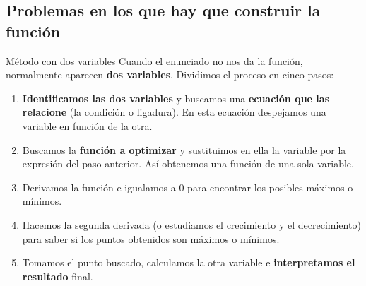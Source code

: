 \documentclass[11pt,a4paper]{article}
\makeatletter
\newcommand{\fmm}[1]{\setbox0=\hbox{$#1$}\ifdim\wd0>0.8\linewidth\def\fmmnext{\fmmdisp{#1}}\else\def\fmmnext{\mbox{\box0}}\fi\fmmnext}
\def\fmmdisp#1{\@ifnextchar.{\fmmdispp{#1}}{\@ifnextchar,{\fmmdispc{#1}}{\@ifnextchar;{\fmmdisps{#1}}{\fmdisp{#1}}}}}
\def\fmmdispp#1.{\fmdisp{#1\,.}}\def\fmmdispc#1,{\fmdisp{#1\,,}}\def\fmmdisps#1;{\fmdisp{#1\,;}}
\newcommand{\fmdisp}[1]{\[\setbox2=\hbox{$\displaystyle #1$}\ifdim\wd2>\linewidth\resizebox{\linewidth}{!}{\box2}\else\box2\fi\]}
\newcommand{\fmuline}[1]{\textbf{\color{fmaccent}#1}}
\makeatother
\begin{document}
\Needspace{5.1cm}
\subsection*{Problemas en los que hay que construir la función}
\begin{fmdef}{Método con dos variables}
Cuando el enunciado no nos da la función, normalmente aparecen \textbf{dos variables}. Dividimos el proceso en cinco pasos:

\begin{enumerate}
\item \textbf{Identificamos las dos variables} y buscamos una \textbf{ecuación que las relacione} (la condición o ligadura). En esta ecuación despejamos una variable en función de la otra.
\item Buscamos la \textbf{función a optimizar} y sustituimos en ella la variable por la expresión del paso anterior. Así obtenemos una función de una sola variable.
\item Derivamos la función e igualamos a 0 para encontrar los posibles máximos o mínimos.
\item Hacemos la segunda derivada (o estudiamos el crecimiento y el decrecimiento) para saber si los puntos obtenidos son máximos o mínimos.
\item Tomamos el punto buscado, calculamos la otra variable e \textbf{interpretamos el resultado} final.
\end{enumerate}

\end{fmdef}
\end{document}

